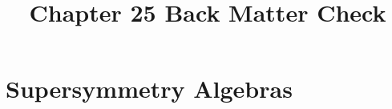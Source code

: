 \documentclass[11pt,a4paper]{article}
\title{Chapter 25 Back Matter Check}
\author{}
\numberwithin{equation}{subsection}
\begin{document}
\maketitle
\setcounter{section}{24}
\section{Supersymmetry Algebras}

\end{document}

